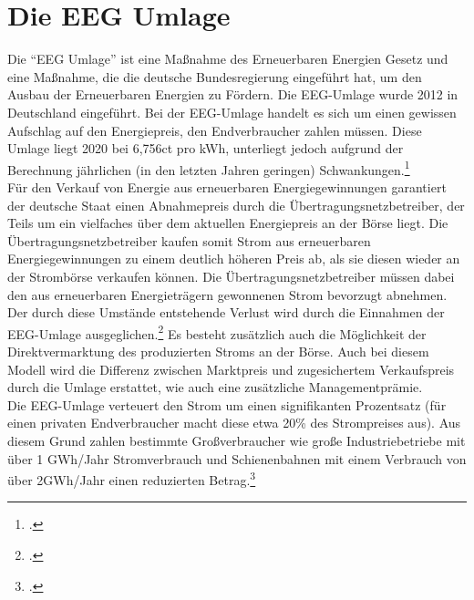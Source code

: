 \section{Die EEG Umlage}
Die \enquote{EEG Umlage} ist eine Maßnahme des Erneuerbaren Energien Gesetz und eine Maßnahme, die die deutsche Bundesregierung eingeführt hat, um den Ausbau der Erneuerbaren Energien zu Fördern.
Die EEG-Umlage wurde 2012 in Deutschland eingeführt. 
Bei der EEG-Umlage handelt es sich um einen gewissen Aufschlag auf den Energiepreis, den Endverbraucher zahlen müssen.
Diese Umlage liegt 2020 bei 6,756ct pro kWh, unterliegt jedoch aufgrund der Berechnung jährlichen (in den letzten Jahren geringen) Schwankungen.\footcite[Vgl.][]{Netztransparenz2020}\\
Für den Verkauf von Energie aus erneuerbaren Energiegewinnungen garantiert der deutsche Staat einen Abnahmepreis durch die Übertragungsnetzbetreiber, der Teils um ein vielfaches über dem aktuellen Energiepreis an der Börse liegt.
Die Übertragungsnetzbetreiber kaufen somit Strom aus erneuerbaren Energiegewinnungen zu einem deutlich höheren Preis ab, als sie diesen wieder an der Strombörse verkaufen können. 
Die Übertragungsnetzbetreiber müssen dabei den aus erneuerbaren Energieträgern gewonnenen Strom bevorzugt abnehmen.
Der durch diese Umstände entstehende Verlust wird durch die Einnahmen der EEG-Umlage ausgeglichen.\footcite[Vgl. auch im Folgenden][]{Bundesnetzagentur2020}
Es besteht zusätzlich auch die Möglichkeit der Direktvermarktung des produzierten Stroms an der Börse. Auch bei diesem Modell wird die Differenz zwischen Marktpreis und zugesichertem Verkaufspreis durch die Umlage erstattet, wie auch eine zusätzliche Managementprämie.
\\
Die EEG-Umlage verteuert den Strom um einen signifikanten Prozentsatz (für einen privaten Endverbraucher macht diese etwa 20\% des Strompreises aus). 
Aus diesem Grund zahlen bestimmte Großverbraucher wie große Industriebetriebe mit über 1 GWh/Jahr Stromverbrauch und Schienenbahnen mit einem Verbrauch von über 2GWh/Jahr einen reduzierten Betrag.\footcite[Vgl.][]{Bundesnetzagentur2020}